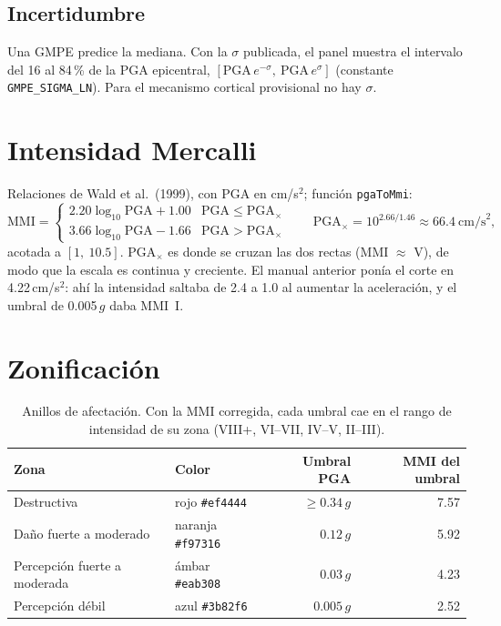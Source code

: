 \documentclass[11pt,a4paper]{article}
\begin{document}
\subsection{Incertidumbre}
Una GMPE predice la mediana. Con la $\sigma$ publicada, el panel muestra el intervalo del 16 al 84\,\%
de la PGA epicentral, $[\mathrm{PGA}\,e^{-\sigma},\ \mathrm{PGA}\,e^{\sigma}]$ (constante
\texttt{GMPE\_SIGMA\_LN}). Para el mecanismo cortical provisional no hay $\sigma$.

\section{Intensidad Mercalli}

Relaciones de Wald et al.\ (1999), con PGA en cm/s$^2$; función \texttt{pgaToMmi}:
\begin{equation}
  \mathrm{MMI} =
  \begin{cases}
    2.20\log_{10}\mathrm{PGA} + 1.00 & \mathrm{PGA} \le \mathrm{PGA}_\times\\
    3.66\log_{10}\mathrm{PGA} - 1.66 & \mathrm{PGA} > \mathrm{PGA}_\times
  \end{cases}
  \qquad
  \mathrm{PGA}_\times = 10^{2.66/1.46} \approx 66.4\ \text{cm/s}^2 ,
\end{equation}
acotada a $[1,\ 10.5]$. $\mathrm{PGA}_\times$ es donde se cruzan las dos rectas (MMI $\approx$ V), de
modo que la escala es continua y creciente. El manual anterior ponía el corte en 4.22\,cm/s$^2$: ahí la
intensidad saltaba de 2.4 a 1.0 al aumentar la aceleración, y el umbral de 0.005\,$g$ daba MMI~I.

\section{Zonificación}

\begin{table}[h]
\centering
\begin{tabular}{llrr}
\toprule
Zona & Color & Umbral PGA & MMI del umbral \\
\midrule
Destructiva & rojo \texttt{\#ef4444} & $\ge 0.34\,g$ & 7.57 \\
Daño fuerte a moderado & naranja \texttt{\#f97316} & $0.12\,g$ & 5.92 \\
Percepción fuerte a moderada & ámbar \texttt{\#eab308} & $0.03\,g$ & 4.23 \\
Percepción débil & azul \texttt{\#3b82f6} & $0.005\,g$ & 2.52 \\
\bottomrule
\end{tabular}
\caption{Anillos de afectación. Con la MMI corregida, cada umbral cae en el rango de intensidad de su
zona (VIII+, VI--VII, IV--V, II--III).}
\end{table}
\end{document}
